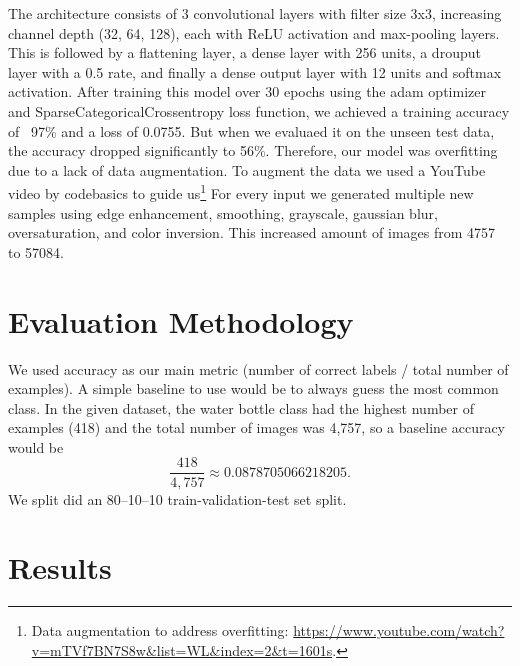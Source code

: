 \documentclass[10pt]{article}
\begin{document}
The architecture consists of 3 convolutional layers with filter size 3x3, increasing channel depth (32, 64, 128), each with ReLU activation and max-pooling layers. This is followed by a flattening layer, a dense layer with 256 units, a drouput layer with a 0.5 rate, and finally a dense output layer with 12 units and softmax activation. After training this model over 30 epochs using the adam optimizer and SparseCategoricalCrossentropy loss function, we achieved a training accuracy of ~97\% and a loss of 0.0755. But when we evaluaed it on the unseen test data, the accuracy dropped significantly to 56\%. Therefore, our model was overfitting due to a lack of data augmentation. To augment the data we used a YouTube video by codebasics to guide us\footnote{Data augmentation to address overfitting: \url{https://www.youtube.com/watch?v=mTVf7BN7S8w&list=WL&index=2&t=1601s}.} For every input we generated multiple new samples using edge enhancement, smoothing, grayscale, gaussian blur, oversaturation, and color inversion. This increased amount of images from 4757 to 57084. 






\section{Evaluation Methodology}

We used accuracy as our main metric (number of correct labels / total number of examples). A simple baseline to use would be to always guess the most common class. In the given dataset, 
the water bottle class had the highest number of examples (418) and the total number of images was 4,757, so a baseline accuracy would be 
\begin{equation}
        \frac{418}{4,757} \approx 0.0878705066218205.
\end{equation}
We split did an 80--10--10 train-validation-test set split.


\section{Results}
\end{document}
